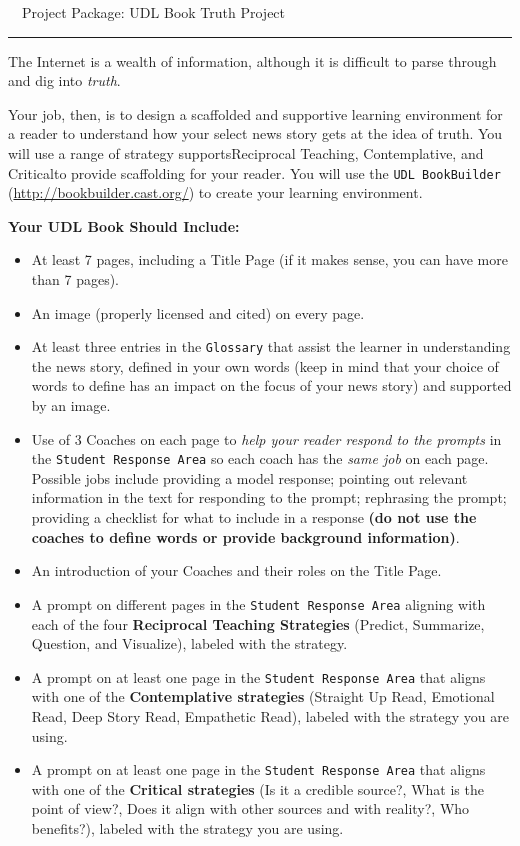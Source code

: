 \documentclass[10pt]{article}
\newcommand{\dueDate}[1]{\textbf{\textcolor{fsuMaroon}{#1}}}
\newcommand{\subHead}[1]{\noindent\textbf{\textsf{\textcolor{fsuMaroon}{#1}}}}
\begin{document}
\begin{center}
\noindent\Large\dueDate{\faBriefcase}~~\textsf{Project Package: UDL Book Truth Project~~\dueDate{\faNewspaperO}}\normalsize\\
\rule{4in}{1pt}
\end{center}

The Internet is a wealth of information, although it is difficult to parse through and dig into \emph{truth}. 

Your job, then, is to design a scaffolded and supportive learning environment for a reader to understand how your select news story gets at the idea of truth. You will use a range of strategy supports{\textemdash}Reciprocal Teaching, Contemplative, and Critical{\textemdash}to provide scaffolding for your reader. You will use the \texttt{UDL BookBuilder} (\url{http://bookbuilder.cast.org/}) to create your learning environment.

\subHead{Your UDL Book Should Include:}
\begin{itemize}
	\itemsep-0.5em
	\item At least 7 pages, including a Title Page (if it makes sense, you can have more than 7 pages).
	\item An image (properly licensed and cited) on every page.
	\item At least three entries in the \texttt{Glossary} that assist the learner in understanding the news story, defined in your own words (keep in mind that your choice of words to define has an impact on the focus of your news story) and supported by an image.
	\item Use of 3 Coaches on each page to \textit{help your reader respond to the prompts} in the \texttt{Student Response Area} so each coach has the \textit{same job} on each page. Possible jobs include providing a model response; pointing out relevant information in the text for responding to the prompt; rephrasing the prompt; providing a checklist for what to include in a response \textbf{(do not use the coaches to define words or provide background information)}.
	\item An introduction of your Coaches and their roles on the Title Page.
	\item A prompt on different pages in the \texttt{Student Response Area} aligning with each of the four \textbf{Reciprocal Teaching Strategies} (Predict, Summarize, Question, and Visualize), labeled with the strategy.
	\item A prompt on at least one page in the \texttt{Student Response Area} that aligns with one of the \textbf{Contemplative strategies} (Straight Up Read, Emotional Read, Deep Story Read, Empathetic Read), labeled with the strategy you are using.
	\item A prompt on at least one page in the \texttt{Student Response Area} that aligns with one of the \textbf{Critical strategies} (Is it a credible source?, What is the point of view?, Does it align with other sources and with reality?, Who benefits?), labeled with the strategy you are using.
\end{itemize}
\end{document}

